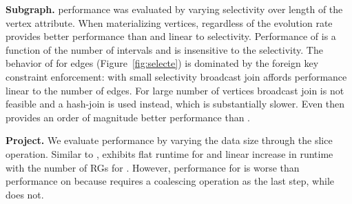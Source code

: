 {\bf Subgraph.}   performance was evaluated by varying
selectivity over length of the vertex attribute.  When materializing
vertices, regardless of the evolution rate \ve provides better
performance than \sg and linear to selectivity.  Performance of \sg is
a function of the number of intervals and is insensitive to
the selectivity.  The behavior of \ve for edges
(Figure~\ref{fig:selecte}) is dominated by the foreign key constraint
enforcement: with small selectivity broadcast join affords performance
linear to the number of edges.  For large number of vertices broadcast
join is not feasible and a hash-join is used instead, which is
substantially slower.  Even then \ve provides an order of magnitude
better performance than \sg.

{\bf Project.}  We evaluate  performance by varying the
data size through the slice operation.  Similar to ,
 exhibits flat runtime for \ve and linear increase in
runtime with the number of RGs for \sg.  However, performance for \ve
is worse than performance on  because 
requires a coalescing operation as the last step, while 
does not.

